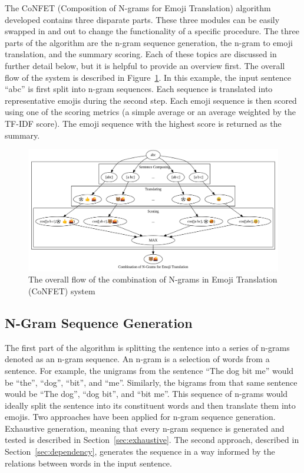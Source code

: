 \documentclass{article}[10]
\begin{document}
The CoNFET (Composition of N-grams for Emoji Translation) algorithm
developed contains three disparate parts. These three modules can be
easily swapped in and out to change the functionality of a specific
procedure. The three parts of the algorithm are the n-gram sequence
generation, the n-gram to emoji translation, and the summary scoring.
Each of these topics are discussed in further detail below, but it is
helpful to provide an overview first. The overall flow of the system is
described in Figure~\ref{fig:flow}. In this example,
the input sentence ``abc'' is first split into n-gram sequences. Each
sequence is translated into representative emojis during the second
step. Each emoji sequence is then scored using one of the scoring
metrics (a simple average or an average weighted by the TF-IDF score).
The emoji sequence with the highest score is returned as the summary.

\begin{figure}[h]
  \begin{center}
    \includegraphics[width=1.0\textwidth]{figures/flow.png}
    \caption{The overall flow of the combination of N-grams in Emoji Translation
      (CoNFET) system\label{fig:flow}}
  \end{center}
\end{figure}

\subsection{N-Gram Sequence Generation\label{sec:N-gramSequenceGeneration}}

The first part of the algorithm is splitting the sentence into a series
of n-grams denoted as an n-gram sequence. An n-gram is a selection of
words from a sentence. For example, the unigrams from the sentence ``The
dog bit me'' would be ``the'', ``dog'', ``bit'', and ``me''. Similarly,
the bigrams from that same sentence would be ``The dog'', ``dog bit'',
and ``bit me''. This sequence of n-grams would ideally split the
sentence into its constituent words and then translate them into emojis.
Two approaches have been applied for n-gram sequence generation.
Exhaustive generation, meaning that every n-gram sequence is generated
and tested is described in Section~\ref{sec:exhaustive}. The second approach, described
in Section~\ref{sec:dependency}, generates the sequence in a
way informed by the relations between words in the input sentence.
\end{document}
